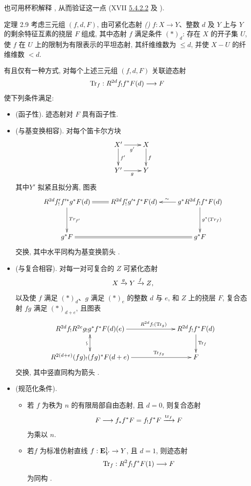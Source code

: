 也可用杯积解释 , 从而验证这一点 (XVII \hyperref[XVII.eq5.4.2.2]{5.4.2.2} 及 ).

\begin{enonce*}{定理 2.9}
考虑三元组 $(f,d,F)$, 由可紧化态射 \emph{()} $f:X\rightarrow Y$、整数 $d$ 及 $Y$ 上与 $Y$ 的剩余特征互素的挠层 $F$ 组成, 其中态射 $f$ 满足条件 $(\ast)_{d}$: 存在 $X$ 的开子集 $U$, 使 $f$ 在 $U$ 上的限制为有限表示的平坦态射, 其纤维维数为 $\leq d$, 并使 $X-U$ 的纤维维数 $< d$.

有且仅有一种方式, 对每个上述三元组 $(f,d,F)$ 关联迹态射
$$
\operatorname{Tr}_{f}:R^{2d}f_{!}f^{\ast}F(d)\longrightarrow F
$$
使下列条件满足:
\begin{itemize}
\item[(Var 1)] (函子性). 迹态射对 $F$ 具有函子性.

\item[(Var 2)] (与基变换相容). 对每个笛卡尔方块
$$
\xymatrix{
X' \ar[r]_{g'}\ar[d]^{f'}& X\ar[d]^{f}\\
Y' \ar[r]_{g} & Y
}
$$
其中\pageoriginale $Y'$ 拟紧且拟分离, 图表
$$
\xymatrix@R=1.25cm{
R^{2d}f'_!f'^{\ast}g^{\ast}F(d) \ar@{=}[r]\ar[d]^{Tr_{f'}}& R^{2d}f'_!
g'^{\ast} f^{\ast} F(d) & g^{\ast}
R^{2d}f_!f^{\ast} F(d) \ar[l]_{\sim} \ar[d]^{g^{\ast}(Tr_f)}\\
g^{\ast}F \ar@{=}[rr]&            & g^{\ast}F
}
$$
交换, 其中水平同构为基变换箭头 \emph{}.

\item[(Var 3)] (与复合相容). 对每一对可复合的 $Z$ 可紧化态射
$$
X\xrightarrow{g}Y\xrightarrow{f}Z{},
$$
以及使 $f$ 满足 $(\ast)_{d}$、$g$ 满足 $(\ast)_{e}$ 的整数 $d$ 与 $e$, 和 $Z$ 上的挠层 $F$, 复合态射 $fg$ 满足 $(\ast)_{d+e}$, 且图表
$$
\xymatrix@C=2.25cm{
R^{2d}f_! R^{2e} g_! g^{\ast} f^{\ast}F(d)(e) \ar@{<->}[d]_{\text{\rotatebox{90}{$\backsim$}}} \ar[r]^(.6){R^{2d}f_!(\Tr_g)} &
R^{2d}f_! f^{\ast}F(d) \ar[d]^{\Tr_f}\\
R^{2(d+e)} (fg)_! (fg)^{\ast} F(d+e) \ar[r]^(.65){\Tr_{fg}} & F
}
$$
交换, 其中竖直同构为箭头 .

\item[(Var 4)] (规范化条件).
\begin{itemize}
\item[(I)] 若 $f$ 为秩为 $n$ 的有限局部自由态射, 且 $d=0$, 则复合态射
$$
F\longrightarrow
f_{\ast}f^{\ast}F=f_{!}f^{\ast}F\xrightarrow{\operatorname{tr}_{f}}F
$$
为乘以 $n$.

\item[(II)] 若\pageoriginale $f$ 为标准仿射直线 $f:\mathbf{E}^{1}_{Y}\rightarrow Y$, 且 $d=1$, 则迹态射
$$
\operatorname{Tr}_{f}: R^{2}f_{!}f^{\ast}F(1)\longrightarrow F
$$
为同构 .
\end{itemize}
\end{itemize}
\end{enonce*}

